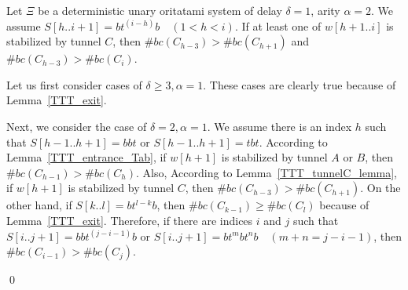 \begin{lemma}
\label{TTT_tunnelC_lemma}
Let $\Xi$ be a deterministic unary oritatami system of delay $\delta = 1$, arity $\alpha = 2$. We assume $S[h..i+1] = bt^{(i-h)}b \quad (1<h<i)$. If at least one of $w[h+1..i]$ is stabilized by tunnel $C$, then $\#bc(C_{h-3}) > \#bc(C_{h+1})$ and $\#bc(C_{h-3}) > \#bc(C_i)$.
\end{lemma}


Let us first consider cases of $\delta \geq 3, \alpha = 1$. These cases are clearly true because of Lemma~\ref{TTT_exit}.


Next, we consider the case of $\delta = 2, \alpha = 1$. We assume there is an index $h$ such that $S[h-1..h+1] = bbt$ or $S[h-1..h+1] = tbt$. According to Lemma~\ref{TTT_entrance_Tab}, if $w[h+1]$ is stabilized by tunnel $A$ or $B$, then $\#bc(C_{h-1}) > \#bc(C_{h})$. Also,  According to Lemma~\ref{TTT_tunnelC_lemma}, if $w[h+1]$ is stabilized by tunnel $C$, then $\#bc(C_{h-3}) > \#bc(C_{h+1})$.
On the other hand, if $S[k..l] = bt^{l-k}b$, then $\#bc(C_{k-1}) \geq \#bc(C_{l})$ because of Lemma~\ref{TTT_exit}. Therefore, if there are indices $i$ and $j$ such that $S[i..j+1] = bbt^{(j-i-1)}b$ or $S[i..j+1] = bt^mbt^nb \quad (m + n = j-i-1)$, then $\#bc(C_{i-1}) > \#bc(C_{j})$.

\qed

